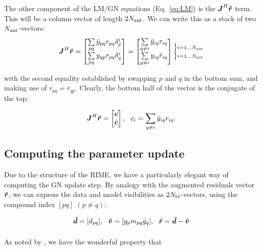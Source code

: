 \documentclass[useAMS,usenatbib]{mn2e}
\makeatletter
\newcommand{\mat}[1]{{\bmath{#1}}}
\newcommand{\JJ}{\mat{J}} %
\newcommand{\Matrix}[2]{\left [ \begin{array}{@{}#1@{}}#2\end{array} \right ]}
\newcommand{\Stack}[1]{\begin{array}{@{}c@{}}#1\end{array}}
\newcommand{\AUG}[1]{\bmath{\breve{#1}}}
\newcommand{\Rr}{\AUG{r}}
\newcommand{\Dd}{\AUG{d}}
\newcommand{\Vv}{\AUG{v}}
\numberwithin{equation}{section} %
\providecommand{\DIFaddbegin}{} %
\providecommand{\DIFaddend}{} %
\providecommand{\DIFdelbegin}{} %
\providecommand{\DIFdelend}{} %
\makeatother
\begin{document}
The other component of the LM/GN equations (Eq.~\ref{eq:LM}) is the $\JJ^H\Rr$ term. This will be a column vector of length $2N_\mathrm{ant}$. We can write this as a stack of two $N_\mathrm{ant}$-vectors:
\begin{equation}
\label{eq:JHR:DI}
\JJ^H\Rr = \Matrix{c}{ 
\sum\limits_{pq} \bar{y}_{pq} r_{pq} \delta^{i}_p  \\
\sum\limits_{pq} y_{qp} r_{pq} \delta^{i}_q 
} = \Matrix{c}{
\sum\limits_{q\ne i} \bar{y}_{iq} r_{iq}   \\
\sum\limits_{q\ne i} y_{iq} \bar{r}_{iq}  
}
\Stack{
\big \} \scriptstyle i=1\dots \Na \\ 
\big \} \scriptstyle i=1\dots \Na
}
\DIFaddend \end{equation}
\DIFdelbegin %

\DIFdelend with the second equality established by swapping $p$ and $q$ in the bottom sum, and making use of $r_{pq}=\bar{r}_{qp}$. Clearly, the bottom half of the vector is the conjugate of the top:
\DIFdelbegin %

\DIFdelend \begin{equation}
\label{eq:JHR:DI1}
\JJ^H\Rr = \Matrix{c}{\bmath{c}\\\bar{\bmath{c}}},~~c_i = \sum\limits_{q\ne i} \bar{y}_{iq} r_{iq}.
\end{equation}


\subsection{Computing the parameter update}

Due to the structure of the RIME, we have a particularly elegant way of computing the GN update step.
By analogy with the augmented residuals vector $\Rr$, we can express the data and model visibilities 
as $2N_\mathrm{bl}$-vectors,
using the compound index $[pq]$ $(p\ne q)$:
\DIFdelbegin %

\DIFdelend \DIFaddbegin \begin{equation}
\DIFaddend \Dd = [ d_{pq} ],~~\Vv = [ g_p m_{pq} \bar{g}_q ],~~\Rr =\Dd-\Vv
\DIFdelbegin %
\end{equation}%
\begin{equation}%
\DIFdelend \DIFaddbegin \end{equation}
\DIFaddend 

As noted by \citet{Tasse-cohjones}, we have the wonderful property that
\DIFdelbegin %
\end{document}
